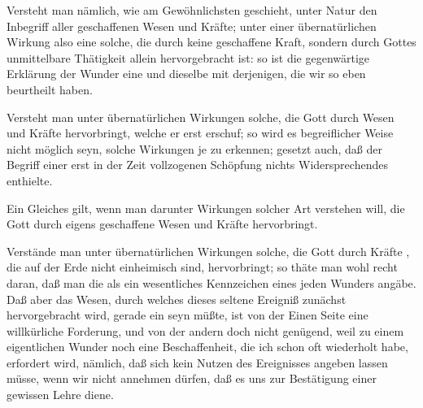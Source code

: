 \begin{aufzb}
\item Versteht man nämlich, wie am Gewöhnlichsten geschieht, unter Natur den Inbegriff aller geschaffenen Wesen und Kräfte; unter einer übernatürlichen Wirkung also eine solche, die durch keine geschaffene Kraft, sondern durch Gottes unmittelbare Thätigkeit allein hervorgebracht ist: so ist die gegenwärtige Erklärung der Wunder eine und dieselbe mit derjenigen, die wir so eben beurtheilt haben.
\item Versteht man unter übernatürlichen Wirkungen solche, die Gott durch Wesen und Kräfte hervorbringt, welche er erst  erschuf; so wird es begreiflicher Weise nicht möglich seyn, solche Wirkungen je zu erkennen; gesetzt auch, daß der Begriff einer erst in der Zeit vollzogenen Schöpfung nichts Widersprechendes enthielte.~ 
\item Ein Gleiches gilt, wenn man darunter Wirkungen solcher Art verstehen will, die Gott durch eigens  geschaffene Wesen und Kräfte hervorbringt.
\item Verstände man unter übernatürlichen Wirkungen solche, die Gott durch Kräfte , die auf der Erde nicht einheimisch sind, hervorbringt; so thäte man wohl recht daran, daß man die  als ein wesentliches Kennzeichen eines jeden Wunders angäbe. Daß aber das Wesen, durch welches dieses seltene Ereigniß zunächst hervorgebracht wird, gerade ein  seyn müßte, ist von der Einen Seite eine willkürliche Forderung, und von der andern doch nicht genügend, weil zu einem eigentlichen Wunder noch eine  Beschaffenheit, die ich schon oft wiederholt habe, erfordert wird, nämlich, daß sich kein Nutzen des Ereignisses angeben lassen müsse, wenn wir nicht annehmen dürfen, daß es uns zur Bestätigung einer gewissen Lehre diene.

\end{aufzb}
